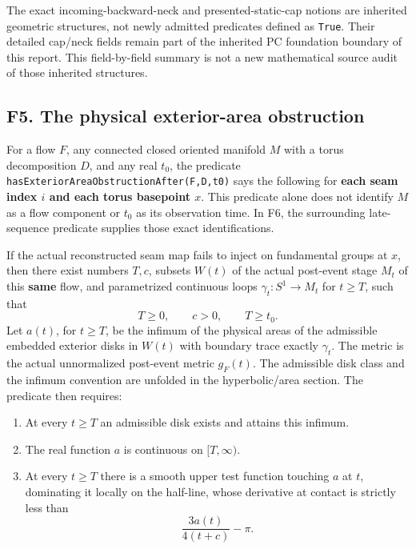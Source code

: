 \documentclass[
  letterpaper,
  11pt]{article}
\providecommand{\tightlist}{%
  \setlength{\itemsep}{0pt}\setlength{\parskip}{0pt}}
\begin{document}
The exact incoming-backward-neck and presented-static-cap notions are
inherited geometric structures, not newly admitted predicates defined as
{\small\texttt{True}}. Their detailed cap/neck fields remain part of the
inherited PC foundation boundary of this report. This field-by-field
summary is not a new mathematical source audit of those inherited
structures.

\subsection{F5. The physical exterior-area
obstruction}\label{f5-area-obstruction}

For a flow \(F\), any connected closed oriented manifold \(M\) with a
torus decomposition \(D\), and any real \(t_0\), the predicate
{\small\texttt{has\allowbreak{}Exterior\allowbreak{}Area\allowbreak{}Obstruction\allowbreak{}After(F,D,t0)}}
says the following for \textbf{each seam index \(i\) and each torus
basepoint \(x\)}. This predicate alone does not identify \(M\) as a flow
component or \(t_0\) as its observation time. In F6, the surrounding
late-sequence predicate supplies those exact identifications.

If the actual reconstructed seam map fails to inject on fundamental
groups at \(x\), then there exist numbers \(T,c\), subsets \(W(t)\) of
the actual post-event stage \(M_t\) of this \textbf{same} flow, and
parametrized continuous loops \(\gamma_t:S^1\to M_t\) for \(t\geq T\),
such that \[
 T\geq0,\qquad c>0,\qquad T\geq t_0.
\] Let \(a(t)\), for \(t\geq T\), be the infimum of the physical areas
of the admissible embedded exterior disks in \(W(t)\) with boundary
trace exactly \(\gamma_t\). The metric is the actual unnormalized
post-event metric \(g_F(t)\). The admissible disk class and the infimum
convention are unfolded in the hyperbolic/area section. The predicate
then requires:

\begin{enumerate}
\def\labelenumi{\arabic{enumi}.}
\tightlist
\item
  At every \(t\geq T\) an admissible disk exists and attains this
  infimum.
\item
  The real function \(a\) is continuous on \([T,\infty)\).
\item
  At every \(t\geq T\) there is a smooth upper test function touching
  \(a\) at \(t\), dominating it locally on the half-line, whose
  derivative at contact is strictly less than
  \[\frac{3a(t)}{4(t+c)}-\pi.\]
\end{enumerate}
\end{document}
